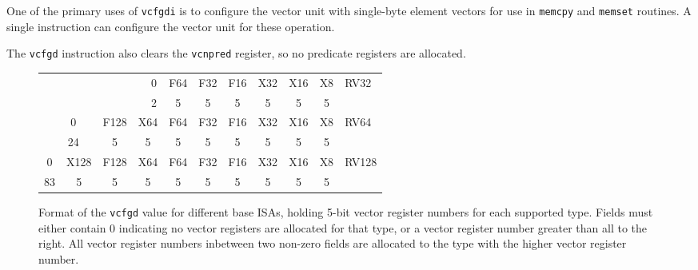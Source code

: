 \begin{commentary}
  One of the primary uses of {\tt vcfgdi} is to configure the vector
  unit with single-byte element vectors for use in {\tt memcpy} and
  {\tt memset} routines.  A single instruction can configure the
  vector unit for these operation.
\end{commentary}

The {\tt vcfgd} instruction also clears the {\tt vcnpred} register, so
no predicate registers are allocated.

\begin{figure}[hbt]
  \centering
  \begin{tabular}{p{2cm}p{2cm}ccc|c|c|c|c|c|c|c|l}
    \cline{6-12}
     &   &    &      &  & 0 & F64 & F32 & F16 & X32 & X16 & X8 & RV32 \\
    \cline{6-12}
    \multicolumn{1}{c}{} &
    \multicolumn{1}{c}{} &
    \multicolumn{1}{c}{} &
    \multicolumn{1}{c}{} & 
    \multicolumn{1}{c}{} &
    \multicolumn{1}{c}{2} &
    \multicolumn{1}{c}{5} &
    \multicolumn{1}{c}{5} &
    \multicolumn{1}{c}{5} &
    \multicolumn{1}{c}{5} &
    \multicolumn{1}{c}{5} &
    \multicolumn{1}{c}{5} &  \\
    \cline{2-12}
     & \multicolumn{2}{|c|}{0} & \multicolumn{1}{c|}{F128} & \multicolumn{2}{c|}{X64} & F64 & F32 & F16 & X32 & X16 & X8 & RV64 \\
    \cline{2-12}
    \multicolumn{1}{c}{} &
    \multicolumn{2}{c}{24} &
    \multicolumn{1}{c}{5} & 
    \multicolumn{2}{c}{5} &
    \multicolumn{1}{c}{5} &
    \multicolumn{1}{c}{5} &
    \multicolumn{1}{c}{5} &
    \multicolumn{1}{c}{5} &
    \multicolumn{1}{c}{5} &
    \multicolumn{1}{c}{5} &  \\
    \cline{1-12}
    \multicolumn{2}{|c|}{0} & \multicolumn{1}{c|}{X128} &
    \multicolumn{1}{c|}{F128} & \multicolumn{2}{c|}{X64} & F64 & F32 & F16 & X32 & X16 & X8 & RV128 \\
    \cline{1-12}
    \multicolumn{2}{c}{83} &
    \multicolumn{1}{c}{5} &
    \multicolumn{1}{c}{5} & 
    \multicolumn{2}{c}{5} &
    \multicolumn{1}{c}{5} &
    \multicolumn{1}{c}{5} &
    \multicolumn{1}{c}{5} &
    \multicolumn{1}{c}{5} &
    \multicolumn{1}{c}{5} &
    \multicolumn{1}{c}{5} &  \\
  \end{tabular}
  \caption{Format of the {\tt vcfgd} value for different base ISAs,
    holding 5-bit vector register numbers for each supported
    type. Fields must either contain 0 indicating no vector registers
    are allocated for that type, or a vector register number greater
    than all to the right.  All vector register numbers inbetween two
    non-zero fields are allocated to the type with the higher vector
    register number. }
  \label{fig:vdcfg}
\end{figure}

